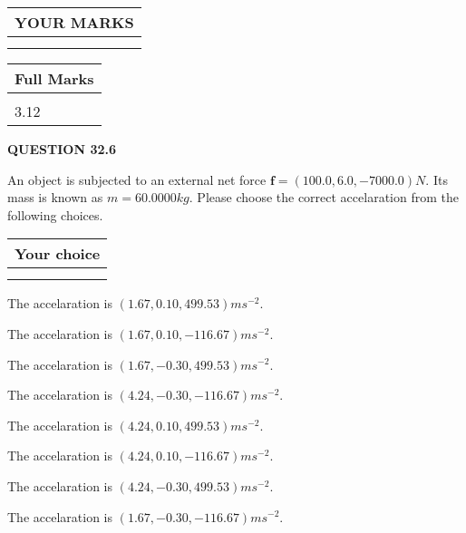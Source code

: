 \documentclass[12pt]{article}
\begin{document}
  
\vspace{0.2in}
  
\noindent\begin{tabular}{|l|}
\hline
 YOUR MARKS  \\
\hline
 \\ 
 \\ 
\hline
\end{tabular}
\hspace{0.05in} \begin{tabular}{|l|}
\hline
 Full Marks  \\
\hline
 \\ 
3.12 \\
\hline
\end{tabular}
{\textbf{\Large{QUESTION
32.6 
}}}
  
  
 
 
An object is subjected to an external net force $\mathbf{f}=
(100.0 , 6.0 , -7000.0) N$.
Its mass is known as $m= %
60.0000 kg$. Please choose the
correct accelaration from the following choices.
 
  
  
\noindent\hspace{3.0in} \begin{tabular}{|l|}
\hline
Your choice \\
\hline
 \\ 
 \\ 
\hline
\end{tabular}
  
  
 
 
The accelaration is $  %
(
1.67,
0.10,
499.53)
ms^{-2} $.
 
 
The accelaration is $  %
(
1.67,
0.10,
-116.67)
ms^{-2} $.
 
 
The accelaration is $  %
(
1.67,
-0.30,
499.53)
ms^{-2} $.
 
 
The accelaration is $  %
(
4.24,
-0.30,
-116.67)
ms^{-2} $.
 
 
The accelaration is $  %
(
4.24,
0.10,
499.53)
ms^{-2} $.
 
 
The accelaration is $  %
(
4.24,
0.10,
-116.67)
ms^{-2} $.
 
 
The accelaration is $  %
(
4.24,
-0.30,
499.53)
ms^{-2} $.
 
 
The accelaration is $  %
(
1.67,
-0.30,
-116.67)
ms^{-2} $.
 
\end{document}

